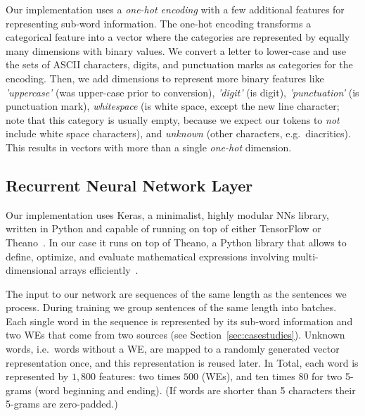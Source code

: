 \documentclass[11pt]{article}
\begin{document}
Our implementation uses a \emph{one-hot encoding} with a few additional
features for representing sub-word information.
The one-hot encoding transforms a categorical feature into a vector where
the categories are represented by equally many dimensions with binary values.
We convert a letter to lower-case and use the sets of ASCII characters, digits,
and punctuation marks as categories for the encoding.
Then, we add dimensions to represent more binary features like
\emph{'uppercase'} (was upper-case prior to conversion), \emph{'digit'} (is
digit), \emph{'punctuation'} (is punctuation mark), \emph{whitespace} (is white
space, except the new line character; note that this category is usually empty,
because we expect our tokens to \emph{not} include white space characters), and
\emph{unknown} (other characters, e.g.~diacritics).
This results in vectors with more than a single \emph{one-hot} dimension. 
%

\subsection{Recurrent Neural Network Layer} %

Our implementation uses Keras, a minimalist, highly modular NNs library,
written in Python and capable of running on top of either TensorFlow or
Theano~\cite{chollet2015}. 
In our case it runs on top of Theano, a Python library that allows to define,
optimize, and evaluate mathematical expressions involving multi-dimensional
arrays efficiently~\cite{Theano2016}.

The input to our network are sequences of the same length as the sentences we
process.
During training we group sentences of the same length into batches.
Each single word in the sequence is represented by its sub-word information and
two WEs that come from two sources (see Section~\ref{sec:casestudies}).
Unknown words, i.e.~words without a WE, are mapped to a randomly generated
vector representation once, and this representation is reused later.
In Total, each word is represented by $1,800$ features: two times $500$ (WEs),
and ten times $80$ for two 5-grams (word beginning and ending).
(If words are shorter than 5 characters their 5-grams are zero-padded.)
\end{document}
